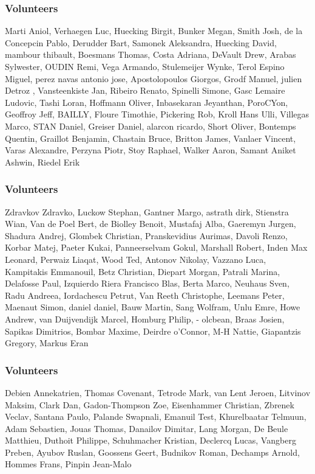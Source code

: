 \documentclass[aspectratio=169]{beamer}
\begin{document}
\begin{frame}
	\frametitle{Volunteers}
Marti Aniol, Verhaegen Luc, Huecking Birgit, Bunker Megan, Smith Josh, de la Concepcin Pablo, Derudder Bart, Samonek Aleksandra, Huecking David, mambour thibault, Boesmans Thomas, Costa Adriana, DeVault Drew, Arabas Sylwester, OUDIN Remi, Vega Armando, Stulemeijer Wynke, Terol Espino Miguel, perez navas antonio jose, Apostolopoulos Giorgos, Grodf Manuel, julien Detroz , Vansteenkiste Jan, Ribeiro Renato, Spinelli Simone, Gasc Lemaire Ludovic, Tashi Loran, Hoffmann Oliver, Inbasekaran Jeyanthan,  PoroCYon,  Geoffroy Jeff,  BAILLY, Floure Timothie, Pickering Rob, Kroll Hans Ulli, Villegas Marco, STAN Daniel, Greiser Daniel, alarcon ricardo, Short Oliver, Bontemps Quentin, Graillot Benjamin, Chastain Bruce, Britton James, Vanlaer Vincent, Varas Alexandre, Perzyna Piotr, Stoy Raphael, Walker Aaron, Samant Aniket Ashwin, Riedel Erik
\end{frame}

\begin{frame}
	\frametitle{Volunteers}
Zdravkov Zdravko, Luckow Stephan, Gantner Margo, astrath dirk, Stienstra Wian, Van de Poel Bert, de Biolley Benoit, Mustafaj Alba, Gaeremyn Jurgen, Shadura Andrej, Glombek Christian, Pranskevidius Aurimas, Davoli Renzo, Korbar Matej, Paeter Kukai, Panneerselvam Gokul, Marshall Robert, Inden Max Leonard, Perwaiz Liaqat, Wood Ted, Antonov Nikolay, Vazzano Luca, Kampitakis Emmanouil, Betz Christian, Diepart Morgan, Patrali Marina, Delafosse Paul, Izquierdo Riera Francisco Blas, Berta Marco, Neuhaus Sven, Radu Andreea, Iordachescu Petrut, Van Reeth Christophe, Leemans Peter, Maenaut Simon, daniel daniel, Bauw Martin, Sang Wolfram, Unlu Emre, Howe Andrew, van Duijvendijk Marcel, Homburg Philip, - olcbean, Braas Josien, Sapikas Dimitrios, Bombar Maxime, Deirdre o'Connor, M-H Nattie, Giapantzis Gregory, Markus Eran
\end{frame}

\begin{frame}
	\frametitle{Volunteers}
Debien Annekatrien, Thomas Covenant, Tetrode Mark, van Lent Jeroen, Litvinov Maksim, Clark Dan, Gadon-Thompson Zoe, Eisenhammer Christian, Zbrenek Veclav, Santana Paulo, Palande Swapnali, Emanuil Test, Khurelbaatar Telmuun, Adam Sebastien, Jouas Thomas, Danailov Dimitar, Lang Morgan, De Beule Matthieu, Duthoit Philippe, Schuhmacher Kristian, Declercq Lucas, Vangberg Preben, Ayubov Ruslan, Goossens Geert, Budnikov Roman, Dechamps Arnold, Hommes Frans, Pinpin Jean-Malo
\end{frame}
\end{document}

